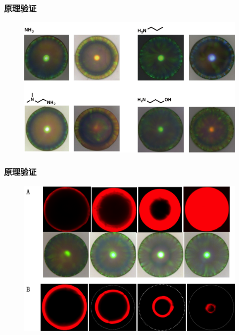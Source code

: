 \documentclass{beamer}
\begin{document}
\begin{frame}
  \frametitle{原理验证}
  \begin{figure}
    \begin{center}
      \includegraphics[width=0.9\linewidth]{figures/ch3/CCB-Amine-reaction.png}
    \end{center}
  \end{figure}
\end{frame}

\begin{frame}
  \frametitle{原理验证}
  \begin{figure}
    \begin{center}
      \includegraphics[width=0.8\linewidth]{figures/ch3/Figure2.png}
    \end{center}
  \end{figure}
\end{frame}
\end{document}
